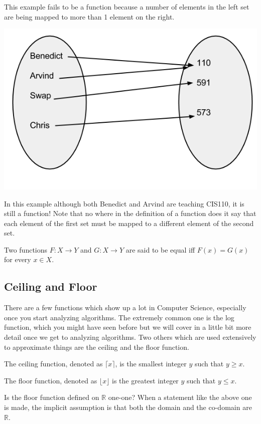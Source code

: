 \documentclass[12pt]{article}
\begin{document}
This example fails to be a function because a number of elements in the left set are being mapped to more than 1 element on the right.

\includegraphics[scale=0.5]{stillAFunc.png}

In this example although both Benedict and Arvind are teaching CIS110, it is still a function! Note that no where in the definition of a function does it say that each element of the first set must be mapped to a different element of the second set.

Two functions $F: X \rightarrow Y$ and $G: X \rightarrow Y$ are said to be equal iff $F(x) = G(x)$ for every $x \in X$.

\subsection*{Ceiling and Floor}
There are a few functions which show up a lot in Computer Science, especially once you start analyzing algorithms. The extremely common one is the log function, which you might have seen before but we will cover in a little bit more detail once we get to analyzing algorithms.
Two others which are used extensively to approximate things are the ceiling and the floor function.

The ceiling function, denoted as $\lceil x \rceil$, is the smallest integer $y$ such that $y \ge x$. 

The floor function, denoted as $\lfloor x \rfloor$ is the greatest integer $y$ such that $y \le x$.

\medskip

Is the floor function defined on $\mathbb{R}$ one-one? 
When a statement like the above one is made, the implicit assumption is that both the domain and the co-domain are $\mathbb{R}$. 
\end{document}
